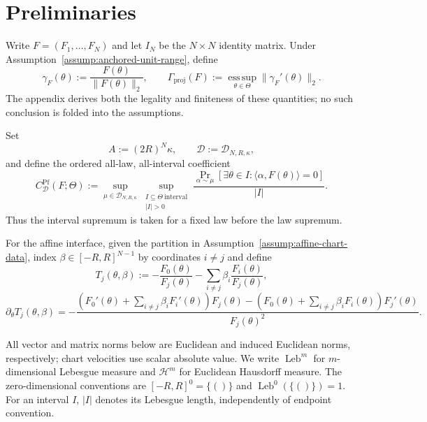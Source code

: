 \section{Preliminaries}
\label{sec:prelim}

Write $F=(F_1,\ldots,F_N)$ and let $I_N$ be the $N\times N$ identity
matrix.  Under Assumption~\ref{assump:anchored-unit-range}, define
\[
\gamma_F(\theta):=\frac{F(\theta)}{\|F(\theta)\|_2},
\qquad
\Gamma_{\mathrm{proj}}(F)
:=\operatorname*{ess\,sup}_{\theta\in\Theta}
  \|\gamma_F'(\theta)\|_2.
\]
The appendix derives both the legality and finiteness of these quantities; no
such conclusion is folded into the assumptions.

Set
\[
A:=(2R)^N\kappa,
\qquad
\mathcal D:=\mathcal D_{N,R,\kappa},
\]
and define the ordered all-law, all-interval coefficient
\[
C^{\mathrm{Pf}}_{\mathcal D}(F;\Theta)
:=\sup_{\mu\in\mathcal D_{N,R,\kappa}}
  \sup_{\substack{I\subseteq\Theta\ \mathrm{interval}\\|I|>0}}
  \frac{\Pr_{\alpha\sim\mu}
  [\exists\theta\in I:\langle\alpha,F(\theta)\rangle=0]}{|I|}.
\]
Thus the interval supremum is taken for a fixed law before the law supremum.

For the affine interface, given the partition in
Assumption~\ref{assump:affine-chart-data}, index
$\beta\in[-R,R]^{N-1}$ by coordinates $i\neq j$ and define
\[
T_j(\theta,\beta)
:=-\frac{F_0(\theta)}{F_j(\theta)}
  -\sum_{i\neq j}\beta_i\frac{F_i(\theta)}{F_j(\theta)},
\]
\[
\partial_\theta T_j(\theta,\beta)
=-\frac{
\left(F_0'(\theta)+\sum_{i\neq j}\beta_iF_i'(\theta)\right)F_j(\theta)
-\left(F_0(\theta)+\sum_{i\neq j}\beta_iF_i(\theta)\right)F_j'(\theta)
}{F_j(\theta)^2}.
\]

All vector and matrix norms below are Euclidean and induced Euclidean norms,
respectively; chart velocities use scalar absolute value.  We write
$\operatorname{Leb}^m$ for $m$-dimensional Lebesgue measure and
$\mathcal H^m$ for Euclidean Hausdorff measure.  The zero-dimensional
conventions are $[-R,R]^0=\{()\}$ and
$\operatorname{Leb}^0(\{()\})=1$.  For an interval $I$, $|I|$ denotes its
Lebesgue length, independently of endpoint convention.
